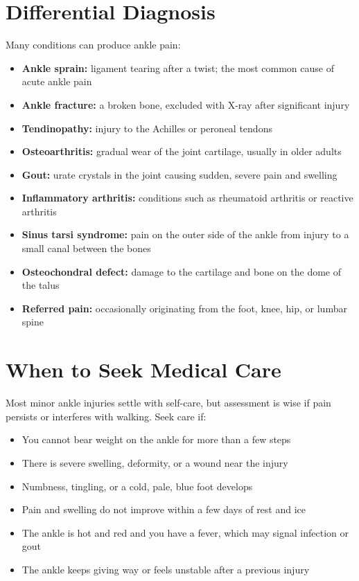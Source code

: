 \section*{Differential Diagnosis}
Many conditions can produce ankle pain:

\begin{itemize}
    \item \textbf{Ankle sprain:} ligament tearing after a twist; the most common cause of acute ankle pain
    \item \textbf{Ankle fracture:} a broken bone, excluded with X-ray after significant injury
    \item \textbf{Tendinopathy:} injury to the Achilles or peroneal tendons
    \item \textbf{Osteoarthritis:} gradual wear of the joint cartilage, usually in older adults
    \item \textbf{Gout:} urate crystals in the joint causing sudden, severe pain and swelling
    \item \textbf{Inflammatory arthritis:} conditions such as rheumatoid arthritis or reactive arthritis
    \item \textbf{Sinus tarsi syndrome:} pain on the outer side of the ankle from injury to a small canal between the bones
    \item \textbf{Osteochondral defect:} damage to the cartilage and bone on the dome of the talus
    \item \textbf{Referred pain:} occasionally originating from the foot, knee, hip, or lumbar spine
\end{itemize}

\section*{When to Seek Medical Care}
Most minor ankle injuries settle with self-care, but assessment is wise if pain persists or interferes with walking. Seek care if:

\begin{itemize}
    \item You cannot bear weight on the ankle for more than a few steps
    \item There is severe swelling, deformity, or a wound near the injury
    \item Numbness, tingling, or a cold, pale, blue foot develops
    \item Pain and swelling do not improve within a few days of rest and ice
    \item The ankle is hot and red and you have a fever, which may signal infection or gout
    \item The ankle keeps giving way or feels unstable after a previous injury
\end{itemize}

